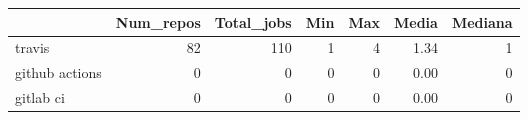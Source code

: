\begin{tabular}{lrrrrrr}
\toprule
{} &  Num\_repos &  Total\_jobs &  Min &  Max &  Media &  Mediana \\
\midrule
travis         &         82 &         110 &    1 &    4 &   1.34 &        1 \\
github actions &          0 &           0 &    0 &    0 &   0.00 &        0 \\
gitlab ci      &          0 &           0 &    0 &    0 &   0.00 &        0 \\
\bottomrule
\end{tabular}
